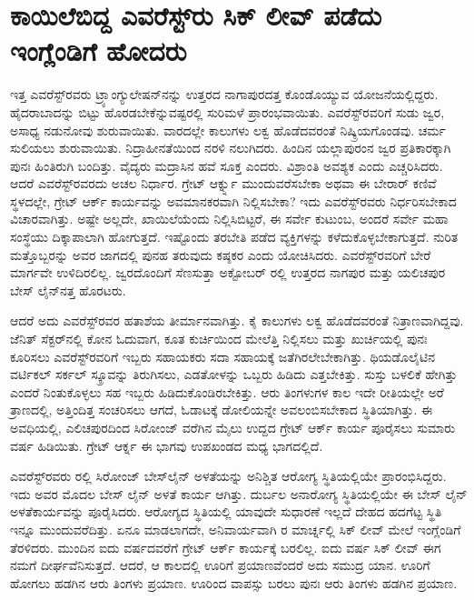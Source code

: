 
\chapter{ಕಾಯಿಲೆಬಿದ್ದ ಎವರೆಸ್ಟ್​ರು ಸಿಕ್​ ಲೀವ್​ ಪಡೆದು ಇಂಗ್ಲೆಂಡಿಗೆ ಹೋದರು}

ಇತ್ತ ಎವರೆಸ್ಟ್​ರವರು ಟ್ರ್ಯಾಂಗ್ಯುಲೇಷನ್​ನನ್ನು ಉತ್ತರದ ನಾಗಾಪುರದತ್ತ ಕೊಂಡೊಯ್ಯುವ ಯೋಜನೆಯಲ್ಲಿದ್ದರು. ಹೈದರಾಬಾದನ್ನು ಬಿಟ್ಟು ಹೊರಡಬೇಕೆನ್ನುವಷ್ಟರಲ್ಲಿ ಸುರಿಮಳೆ ಪ್ರಾರಂಭವಾಯಿತು. ಎವರೆಸ್ಟ್​ರವರಿಗೆ ಸುಡು ಜ್ವರ, ಅಸಾಧ್ಯ ನಡುನೋವು ಶುರುವಾಯಿತು. ವಾರದಲ್ಲೇ ಕಾಲುಗಳು ಲಕ್ವ ಹೊಡೆದವರಂತೆ ನಿಷ್ಕ್ರಿಯಗೊಂಡವು. ಚರ್ಮ ಸುಲಿಯಲು ಶುರುವಾಯಿತು. ನಿದ್ರಾಹೀನತೆಯಿಂದ ನರಳಿ ನಲುಗಿದರು. ಹಿಂದಿನ ಯಲ್ಲಾಪುರಂನ ಜ್ವರ ಪ್ರತಿಕಾರಕ್ಕಾಗಿ ಪುನಃ ಹಿಂತಿರುಗಿ ಬಂದಿತ್ತು. ವೈದ್ಯರು ಮದ್ರಾಸಿನ ಹವೆ ಸೂಕ್ತ ಎಂದರು. ವಿಶ್ರಾಂತಿ ಅವಶ್ಯಕ ಎಂದು ಎಚ್ಚರಿಸಿದರು. ಆದರೆ ಎವರೆಸ್ಟ್​ರವರದು ಅಚಲ ನಿರ್ಧಾರ. ಗ್ರೇಟ್​ ಆರ್ಕ್ನ್ನು ಮುಂದುವರೆಸಬೇಕಾ ಅಥವಾ ಈ ಬೇರಾರ್​ ಕಣಿವೆ ಸ್ಥಳದಲ್ಲೇ, ಗ್ರೇಟ್​ ಆರ್ಕ್ ಕಾರ್ಯವನ್ನು ಅವಮಾನಕರವಾಗಿ ನಿಲ್ಲಿಸಬೇಕಾ? ಇದು ಎವರೆಸ್ಟ್​ರವರು ನಿರ್ಧರಿಸಬೇಕಾದ ವಿಚಾರವಾಗಿತ್ತು. ಅಷ್ಟೇ ಅಲ್ಲದೇ, ಖಾಯಿಲೆಯೆಂದು ನಿಲ್ಲಿಸಿಬಿಟ್ಟರೆ, ಈ ಸರ್ವೇ ಕುಟುಂಬ, ಅಂದರೆ ಸರ್ವೇ ಮಹಾ ಸಂಸ್ಥೆಯು ದಿಕ್ಕಾಪಾಲಾಗಿ ಹೋಗುತ್ತದೆ. ಇಷ್ಟೊಂದು ತರಬೇತಿ ಪಡೆದ ವ್ಯಕ್ತಿಗಳನ್ನು ಕಳೆದುಕೊಳ್ಳಬೇಕಾಗುತ್ತದೆ. ನುರಿತ ಮತ್ತೊಬ್ಬರನ್ನು ಅವರ ಜಾಗದಲ್ಲಿ ಪುನಹ ತರುವುದು ಕಷ್ಠಕರ ಎಂದು ಯೋಚಿಸಿದರು. ಎವರೆಸ್ಟ್​ರವರಿಗೆ ಬೇರೆ ಮಾರ್ಗವೇ ಉಳಿದಿರಲಿಲ್ಲ. ಜ್ವರದೊಂದಿಗೆ ಸೆಣಸುತ್ತಾ ಅಕ್ಟೋಬರ್​ ರಲ್ಲಿ ಉತ್ತರದ ನಾಗಪುರ ಮತ್ತು ಯಲಿಚಪುರ ಬೇಸ್​ ಲೈನ್​ನತ್ತ ಹೊರಟರು.

\newpage

ಆದರೆ ಅದು ಎವರೆಸ್ಟ್​ರವರ ಹತಾಶೆಯ ತೀರ್ಮಾನವಾಗಿತ್ತು. ಕೈ ಕಾಲುಗಳು ಲಕ್ವ ಹೊಡೆದವರಂತೆ ನಿತ್ರಾಣವಾಗಿದ್ದವು. ಜೆನಿತ್​ ಸೆಕ್ಟರ್​ನಲ್ಲಿ ಕೋನ ಓದುವಾಗ, ಕೂತ ಕುರ್ಚಿಯಿಂದ ಮೇಲೆತ್ತಿ ನಿಲ್ಲಿಸಲು ಮತ್ತು ಖುರ್ಚಿಯಲ್ಲಿ ಪುನಃ ಕೂರಿಸಲು ಎವರೆಸ್ಟ್​ರವರಿಗೆ ಇಬ್ಬರು ಸಹಾಯಕರು ಸದಾ ಸಹಾಯಕ್ಕೆ ಜತೆಗಿರಲೇಬೇಕಾಗಿತ್ತು. ಥಿಯಡೊಲೈಟಿನ ವರ್ಟಿಕಲ್​ ಸರ್ಕಲ್​ ಸ್ಕ್ರೂವನ್ನು ತಿರುಗಿಸಲು, ಎಡತೋಳನ್ನು ಒಬ್ಬರು ಹಿಡಿದು ಎತ್ತಬೇಕಿತ್ತು. ಸುಸ್ತು ಬಳಲಿಕೆ ಹೇಗಿತ್ತು ಎಂದರೆ ನಿಂತುಕೊಳ್ಳಲು ಸಹ ಇಬ್ಬರು ಹಿಡಿದುಕೊಂಡಿರಬೇಕಿತ್ತು. ಆರು ತಿಂಗಳುಗಳ ಕಾಲ ಇದೇ ರೀತಿಯಲ್ಲೇ ಅರೆ ತ್ರಾಣದಲ್ಲಿ, ಅತ್ತಿಂದಿತ್ತ ಸಂಚರಿಸಲು ಆಗದೆ, ಓಡಾಟಕ್ಕೆ ಡೋಲಿಯನ್ನೇ ಅವಲಂಬಿಸಬೇಕಾದ ಸ್ಥಿತಿಯಾಗಿತ್ತು. ಈ ಅವಧಿಯಲ್ಲಿ, ಎಲಿಚಪುರದಿಂದ ಸಿರೋಂಜ್​ ವರೆಗಿನ  ಮೈಲು ಉದ್ದದ ಗ್ರೇಟ್​ ಆರ್ಕ್ ಕಾರ್ಯ ಪೂರೈಸಲು ಸುಮಾರು  ವರ್ಷ ಹಿಡಿಯಿತು. ಗ್ರೇಟ್​ ಆರ್ಕ್ನ ಈ ಭಾಗವು ಉಪಖಂಡದ ಮಧ್ಯ ಭಾಗದಲ್ಲಿದೆ.

ಎವರೆಸ್ಟ್​ರವರು ರಲ್ಲಿ ಸಿರೋಂಜ್​ ಬೇಸ್​ಲೈನ್​ ಅಳತೆಯನ್ನು ಅನಿಶ್ಚಿತ ಆರೋಗ್ಯ ಸ್ಥಿತಿಯಲ್ಲಿಯೇ ಪ್ರಾರಂಭಿಸಿದ್ದರು. ಇದು ಅವರ ಮೊದಲ ಬೇಸ್​ ಲೈನ್​ ಅಳತೆ ಕಾರ್ಯ ಆಗಿತ್ತು. ದುರ್ಬಲ ಅನಾರೋಗ್ಯ ಸ್ಥಿತಿಯಲ್ಲಿಯೇ ಈ ಬೇಸ್​ ಲೈನ್​ ಅಳತೆಕಾರ್ಯವನ್ನು ಪೂರೈಸಿದರು. ಆರೋಗ್ಯದ ಸ್ಥಿತಿಯಲ್ಲಿ ಯಾವುದೇ ಸುಧಾರಣೆ ಇಲ್ಲದೆ ದೇಹದ ಹದಗೆಟ್ಟ ಸ್ಥಿತಿ ಇನ್ನೂ ಮುಂದುವರೆದಿತ್ತು. ಏನೂ ಮಾಡಲಾಗದೇ, ಅನಿವಾರ್ಯವಾಗಿ ರ ಮಾರ್ಚ್ನಲ್ಲಿ ಸಿಕ್​ ಲೀವ್​ ಮೇಲೆ ಇಂಗ್ಲೆಂಡಿಗೆ ತೆರಳಿದರು. ಮುಂದಿನ ಐದು ವರ್ಷದವರೆಗೆ ಗ್ರೇಟ್​ ಆರ್ಕ್ ಕಾರ್ಯಕ್ಕೆ ಬರಲಿಲ್ಲ. ಐದು ವರ್ಷ ಸಿಕ್​ ಲೀವ್​ ಈಗ ನಮಗೆ ದೀರ್ಘವೆನಿಸುತ್ತದೆ. ಆದರೆ, ಆ ಕಾಲದಲ್ಲಿ ಊರಿಗೆ ಪ್ರಯಾಣವೆಂದರೆ ಅದು ಸಮುದ್ರ ಯಾನ. ಊರಿಗೆ ಹೋಗಲು ಹಡಗಿನ ಆರು ತಿಂಗಳು ಪ್ರಯಾಣ. ಊರಿಂದ ವಾಪಸ್ಸು ಬರಲು ಪುನಃ ಆರು ತಿಂಗಳು ಹಡಗಿನ ಪ್ರಯಾಣ.

